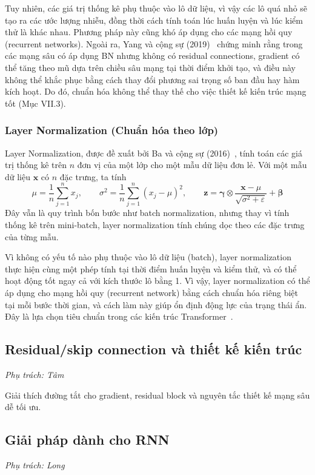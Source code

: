 \documentclass[12pt]{article}
\begin{document}
Tuy nhiên, các giá trị thống kê phụ thuộc vào lô dữ liệu, vì vậy các lô quá nhỏ sẽ tạo ra các ước lượng nhiễu, đồng thời cách tính toán lúc huấn luyện và lúc kiểm thử là khác nhau. Phương pháp này cũng khó áp dụng cho các mạng hồi quy (recurrent networks). Ngoài ra, Yang và cộng sự (2019)~\cite{yang2019} chứng minh rằng trong các mạng sâu có áp dụng BN nhưng không có residual connections, gradient có thể tăng theo mũ dựa trên chiều sâu mạng tại thời điểm khởi tạo, và điều này không thể khắc phục bằng cách thay đổi phương sai trọng số ban đầu hay hàm kích hoạt. Do đó, chuẩn hóa không thể thay thế cho việc thiết kế kiến trúc mạng tốt (Mục VII.3).

\subsubsection{Layer Normalization (Chuẩn hóa theo lớp)}

Layer Normalization, được đề xuất bởi Ba và cộng sự (2016)~\cite{ba2016layernorm}, tính toán các giá trị thống kê trên $n$ đơn vị của một lớp cho một mẫu dữ liệu đơn lẻ. Với một mẫu dữ liệu $\mathbf{x}$ có $n$ đặc trưng, ta tính
\[ \mu = \frac{1}{n}\sum_{j=1}^{n}x_j, \qquad \sigma^2=\frac{1}{n}\sum_{j=1}^{n}(x_j-\mu)^2, \qquad \mathbf{z}=\boldsymbol{\gamma}\otimes\frac{\mathbf{x}-\mu}{\sqrt{\sigma^2+\varepsilon}}+\boldsymbol{\beta}\]
Đây vẫn là quy trình bốn bước như batch normalization, nhưng thay vì tính thống kê trên mini-batch, layer normalization tính chúng dọc theo các đặc trưng của từng mẫu.

Vì không có yếu tố nào phụ thuộc vào lô dữ liệu (batch), layer normalization thực hiện cùng một phép tính tại thời điểm huấn luyện và kiểm thử, và có thể hoạt động tốt ngay cả với kích thước lô bằng 1. Vì vậy, layer normalization có thể áp dụng cho mạng hồi quy (recurrent network) bằng cách chuẩn hóa riêng biệt tại mỗi bước thời gian, và cách làm này giúp ổn định động lực của trạng thái ẩn. Đây là lựa chọn tiêu chuẩn trong các kiến trúc Transformer~\cite{vaswani2017}.

\subsection{Residual/skip connection và thiết kế kiến trúc}
\textit{Phụ trách: Tâm}

Giải thích đường tắt cho gradient, residual block và nguyên tắc thiết kế mạng sâu dễ tối ưu.

\subsection{Giải pháp dành cho RNN}
\textit{Phụ trách: Long}
\end{document}
